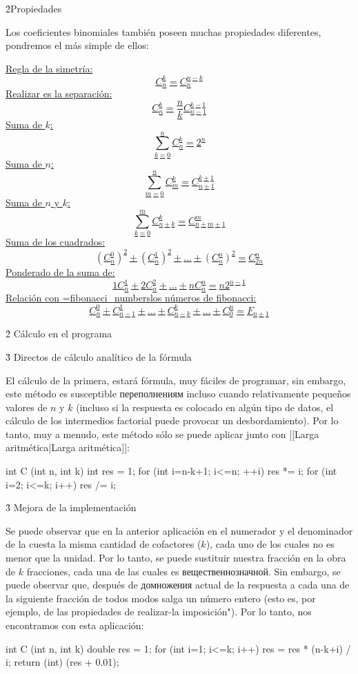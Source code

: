 \h2{Propiedades}

Los coeficientes binomiales también poseen muchas propiedades diferentes, pondremos el más simple de ellos:

\ul{
\li Regla de la simetría:
$$ C_n^k = C_n^{n-k} $$
\li Realizar es la separación:
$$ C_n^k = \frac{n}{k} C_{n-1}^{k-1} $$
\li Suma de $k$:
$$ \sum_{k=0}^n C_n^k = 2^n $$
\li Suma de $n$:
$$ \sum_{m=0}^n C_m^k = C_{n+1}^{k+1} $$
\li Suma de $n$ y $k$:
$$ \sum_{k=0}^{m} C_{n+k}^k = C_{n+m+1}^m $$
\li Suma de los cuadrados:
$$ (C_n^0)^2 + (C_n^1)^2 + \ldots + (C_n^n)^2 = C_{2n}^n $$
\li Ponderado de la suma de:
$$ 1 C_n^1 + 2 C_n^2 + \ldots + n C_n^n = n 2^{n-1} $$
\li Relación con \algohref=fibonacci_numbers{los números de fibonacci}:
$$ C_n^0 + C_{n-1}^1 + \ldots + C_{n-k}^k + \ldots + C_0^n = F_{n+1} $$
}


\h2{ Cálculo en el programa }

\h3{ Directos de cálculo analítico de la fórmula }

El cálculo de la primera, estará fórmula, muy fáciles de programar, sin embargo, este método es susceptible переполнениям incluso cuando relativamente pequeños valores de $n$ y $k$ (incluso si la respuesta es colocado en algún tipo de datos, el cálculo de los intermedios factorial puede provocar un desbordamiento). Por lo tanto, muy a menudo, este método sólo se puede aplicar junto con [[Larga aritmética|Larga aritmética]]:

\code

int C (int n, int k) {
int res = 1;
for (int i=n-k+1; i<=n; ++i)
res *= i;
for (int i=2; i<=k; i++)
res /= i;
}
\endcode

\h3{ Mejora de la implementación }

Se puede observar que en la anterior aplicación en el numerador y el denominador de la cuesta la misma cantidad de cofactores ($k$), cada uno de los cuales no es menor que la unidad. Por lo tanto, se puede sustituir nuestra fracción en la obra de $k$ fracciones, cada una de las cuales es вещественнозначной. Sin embargo, se puede observar que, después de домножения actual de la respuesta a cada una de la siguiente fracción de todos modos salga un número entero (esto es, por ejemplo, de las propiedades de realizar-la imposición"). Por lo tanto, nos encontramos con esta aplicación:

\code

int C (int n, int k) {
double res = 1;
for (int i=1; i<=k; i++)
res = res * (n-k+i) / i;
return (int) (res + 0.01);
}
\endcode

